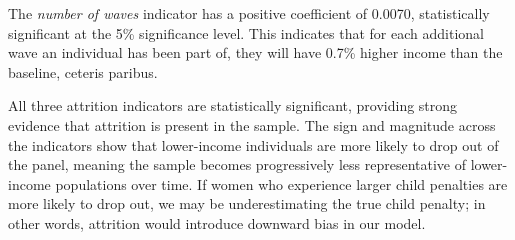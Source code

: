 The \emph{number of waves} indicator has a positive coefficient of 0.0070, statistically significant at the 5\% significance level. This indicates that for each additional wave an individual has been part of, they will have 0.7\% higher income than the baseline, ceteris paribus.

All three attrition indicators are statistically significant, providing strong evidence that attrition is present in the sample. The sign and magnitude across the indicators show that lower-income individuals are more likely to drop out of the panel, meaning the sample becomes progressively less representative of lower-income populations over time. If women who experience larger child penalties are more likely to drop out, we may be underestimating the true child penalty; in other words, attrition would introduce downward bias in our model.

